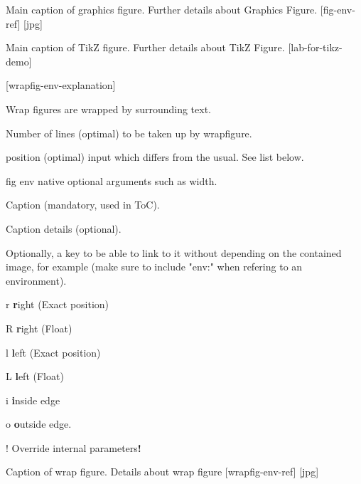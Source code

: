 \begin{wrtxFigEnv}[][width=0.6\linewidth]
  {Main caption of graphics figure.}%
  {Further details about Graphics Figure.}%
  [fig-env-ref]
  [jpg]%
\end{wrtxFigEnv}


\begin{wrtxFigEnv}[][width=1\linewidth]
  {Main caption of TikZ figure.}%
  {Further details about TikZ Figure.}%
  [lab-for-tikz-demo]
\end{wrtxFigEnv}



[wrapfig-env-explanation]

Wrap figures are wrapped by surrounding text.
\begin{wrtxListItemize}
  \item Number of lines (optimal) to be taken up by wrapfigure.
  \item position (optimal) input which differs from the usual. See list below.
  \item fig env native optional arguments such as width.
  \item Caption (mandatory, used in ToC).
  \item Caption details (optional).
  \item Optionally, a key to be able to link to it without depending on the contained image, for example  (make sure to include "env:" when refering to an environment).
\end{wrtxListItemize}

\begin{wrtxListMeta}
  \item[r] \textbf{r}ight (Exact position)
  \item[R] \textbf{r}ight (Float)
  \item[l] \textbf{l}eft (Exact position)
  \item[L] \textbf{l}eft (Float)
  \item[i] \textbf{i}nside edge
  \item[o] \textbf{o}utside edge.
  \item[!] Override internal parameters\textbf{!}
\end{wrtxListMeta}


\begin{wrtxWrapFigEnv}[8][R][0.33\textwidth]
  {Caption of wrap figure.}%
  {Details about wrap figure}%
  [wrapfig-env-ref]
  [jpg]%
\end{wrtxWrapFigEnv}

